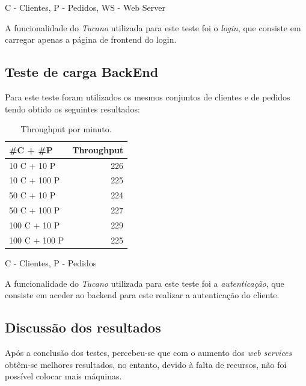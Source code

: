 \hspace{53mm} C - Clientes, P - Pedidos, WS - Web Server

\hspace{5mm} A funcionalidade do \emph{Tucano} utilizada para este teste foi o \emph{login}, que consiste em carregar apenas a página de frontend do login.

\subsection{Teste de carga BackEnd} \label{subsec:testeBack}

\hspace{5mm} Para este teste foram utilizados os mesmos conjuntos de clientes e de pedidos tendo obtido os seguintes resultados:

\begin{table}[H]
    \centering
    \begin{tabular}{|l||r|}
    \hline
        \#C + \#P & Throughput \\ \hline \hline
        10 C + 10 P & 226 \\ \hline
        10 C + 100 P & 225 \\ \hline
        50 C + 10 P & 224 \\ \hline
        50 C + 100 P & 227 \\ \hline
        100 C + 10 P & 229 \\ \hline
        100 C + 100 P & 225 \\ \hline
    \end{tabular}
    \caption{Throughput por minuto.}
    \label{tab:testeFront}
\end{table}

\hspace{68mm} C - Clientes, P - Pedidos

\hspace{5mm} A funcionalidade do \emph{Tucano} utilizada para este teste foi a \emph{autenticação}, que consiste em aceder ao backend para este realizar a autenticação do cliente.

\subsection{Discussão dos resultados}

\hspace{5mm} Após a conclusão dos testes, percebeu-se que com o aumento dos \emph{web services} obtêm-se melhores resultados, no entanto, devido à falta de recursos, não foi possível colocar mais máquinas.

